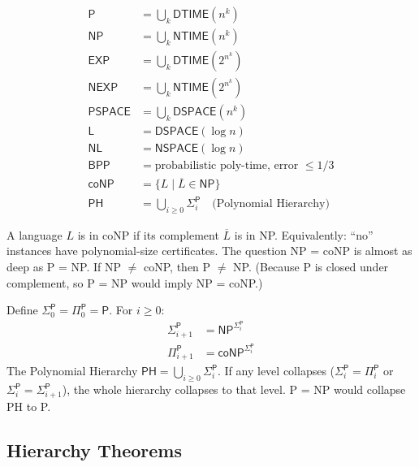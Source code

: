 \begin{definition}
\begin{align*}
\mathsf{P} &= \bigcup_{k} \mathsf{DTIME}(n^k) \\
\mathsf{NP} &= \bigcup_{k} \mathsf{NTIME}(n^k) \\
\mathsf{EXP} &= \bigcup_{k} \mathsf{DTIME}(2^{n^k}) \\
\mathsf{NEXP} &= \bigcup_{k} \mathsf{NTIME}(2^{n^k}) \\
\mathsf{PSPACE} &= \bigcup_{k} \mathsf{DSPACE}(n^k) \\
\mathsf{L} &= \mathsf{DSPACE}(\log n) \\
\mathsf{NL} &= \mathsf{NSPACE}(\log n) \\
\mathsf{BPP} &= \text{probabilistic poly-time, error } \le 1/3 \\
\mathsf{coNP} &= \{ L \mid \overline{L} \in \mathsf{NP} \} \\
\mathsf{PH} &= \bigcup_{i \ge 0} \Sigma_i^{\mathsf{P}} \quad \text{(Polynomial Hierarchy)}
\end{align*}
\end{definition}

\begin{definition}
A language $L$ is in coNP if its complement $\overline{L}$ is in NP. Equivalently: ``no'' instances have polynomial-size certificates. The question NP = coNP is almost as deep as P = NP. If NP $\neq$ coNP, then P $\neq$ NP. (Because P is closed under complement, so P = NP would imply NP = coNP.)
\end{definition}

\begin{definition}
Define $\Sigma_0^{\mathsf{P}} = \Pi_0^{\mathsf{P}} = \mathsf{P}$. For $i \ge 0$:
\begin{align*}
\Sigma_{i+1}^{\mathsf{P}} &= \mathsf{NP}^{\Sigma_i^{\mathsf{P}}} \\
\Pi_{i+1}^{\mathsf{P}} &= \mathsf{coNP}^{\Sigma_i^{\mathsf{P}}}
\end{align*}
The Polynomial Hierarchy $\mathsf{PH} = \bigcup_{i \ge 0} \Sigma_i^{\mathsf{P}}$. If any level collapses ($\Sigma_i^{\mathsf{P}} = \Pi_i^{\mathsf{P}}$ or $\Sigma_i^{\mathsf{P}} = \Sigma_{i+1}^{\mathsf{P}}$), the whole hierarchy collapses to that level. P = NP would collapse PH to P.
\end{definition}

\subsection{Hierarchy Theorems}
\label{sec:complexity:hierarchy}

